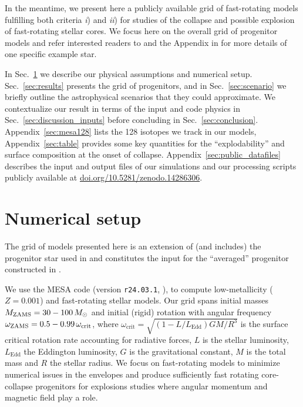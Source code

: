 \documentclass[%
trackchanges,twocolumn]{aastex701}
\DeclareRobustCommand{\Secref}[1]{Sec.~\ref{#1}}
\begin{document}
In the meantime, we present here a publicly available grid of
fast-rotating models fulfilling both criteria \emph{i}) and \emph{ii})
for studies of the collapse and possible explosion of fast-rotating
stellar cores. We focus here on the overall grid
  of progenitor models and refer interested readers to \cite{renzo:24}
  and the Appendix in \cite{gottlieb:24} for more details of one
  specific example star.

In \Secref{sec:methods} we describe our physical
assumptions and numerical setup. \Secref{sec:results} presents the
grid of progenitors, and in \Secref{sec:scenario} we briefly outline
the astrophysical scenarios that they could approximate. We
contextualize our result in terms of the input and code physics in
\Secref{sec:discussion_inputs} before concluding in
\Secref{sec:conclusion}. Appendix~\ref{sec:mesa128} lists the 128
isotopes we track in our models, Appendix~\ref{sec:table} provides
some key quantities for the ``explodability'' and surface composition
at the onset of collapse. Appendix~\ref{sec:public_datafiles}
describes the input and output files of our simulations and our
processing scripts publicly available at
\href{https://doi.org/10.5281/zenodo.14286306}{doi.org/10.5281/zenodo.14286306}.

\section{Numerical setup}
\label{sec:methods}

The grid of models presented here is an extension of (and includes)
the progenitor star used in \cite{gottlieb:24} and constitutes the
input for the ``averaged'' progenitor constructed in \cite{chan:26}.

We use the \textsc{MESA} code (version \texttt{r24.03.1},
\citealt{paxton:11,paxton:13,paxton:15,paxton:16,paxton:19,jermyn:23}),
to compute low-metallicity ($Z=0.001$) and fast-rotating stellar
models. Our grid spans initial masses $M_{\rm ZAMS}=30-100\,M_{\odot}$
and initial (rigid) rotation with angular frequency
$\omega_{\rm ZAMS}=0.5-0.99\,\omega_{\rm crit}$, where
$\omega_\mathrm{crit}=\sqrt{(1-L/L_\mathrm{Edd})GM/R^3}$ is the
surface critical rotation rate accounting for radiative forces, $L$ is
the stellar luminosity, $L_\mathrm{Edd}$ the Eddington luminosity, $G$
is the gravitational constant, $M$ is the total mass and $R$ the
stellar radius. We focus on fast-rotating models to minimize numerical
issues in the envelopes \citep[e.g.][]{joss:73, paxton:13} and produce
sufficiently fast rotating core-collapse progenitors for explosions
studies where angular momentum and magnetic field play a role.
\end{document}
